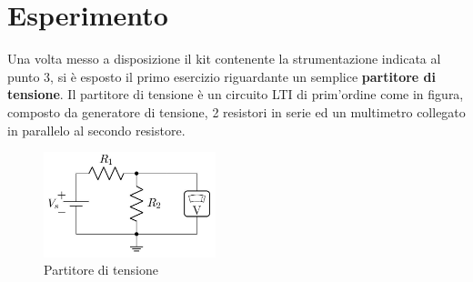     \section{Esperimento}
    Una volta messo a disposizione il kit contenente la strumentazione indicata al punto $3$, %
    si è esposto il primo esercizio riguardante un semplice \textbf{partitore di tensione}.
    Il partitore di tensione è un circuito LTI di prim'ordine come in figura, composto da
    generatore di tensione, 2 resistori in serie ed un multimetro collegato in parallelo al secondo resistore.

    \begin{figure}[!h]            %
        \begin{center}
            \includegraphics[width = 5cm]{ese1.png}
            \caption{Partitore di tensione}
            \label{ese1}
        \end{center}
    \end{figure}
    

